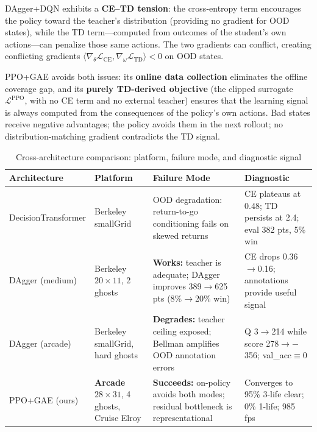 \documentclass[11pt,a4paper]{article}
\theoremstyle{definition}
\begin{document}
DAgger+DQN exhibits a \textbf{CE--TD tension}: the cross-entropy term encourages the policy toward the teacher's distribution (providing no gradient for OOD states), while the TD term---computed from outcomes of the student's own actions---can penalize those same actions. The two gradients can conflict, creating conflicting gradients $\langle \nabla_\theta\mathcal{L}_{\text{CE}}, \nabla_\omega\mathcal{L}_{\text{TD}} \rangle < 0$ on OOD states.

PPO+GAE avoids both issues: its \textbf{online data collection} eliminates the offline coverage gap, and its \textbf{purely TD-derived objective} (the clipped surrogate $\mathcal{L}^{\text{PPO}}$, with no CE term and no external teacher) ensures that the learning signal is always computed from the consequences of the policy's own actions. Bad states receive negative advantages; the policy avoids them in the next rollout; no distribution-matching gradient contradicts the TD signal.

\begin{table}[ht]
\centering
\small
\caption{Cross-architecture comparison: platform, failure mode, and diagnostic signal}
\label{tab:cross-arch}
\begin{tabular}{@{}p{2.2cm}p{2.6cm}p{3.2cm}p{3.4cm}@{}}
\toprule
\textbf{Architecture} & \textbf{Platform} & \textbf{Failure Mode} & \textbf{Diagnostic} \\
\midrule
Decision\-Transformer & Berkeley smallGrid & OOD degradation: return-to-go conditioning fails on skewed returns & CE plateaus at 0.48; TD persists at 2.4; eval 382 pts, 5\% win \\
\midrule
DAgger (medium) & Berkeley $20\!\times\!11$, 2 ghosts & \textbf{Works:} teacher is adequate; DAgger improves 389$\to$625 pts (8\%$\to$20\% win) & CE drops 0.36$\to$0.16; annotations provide useful signal \\
\midrule
DAgger (arcade) & Berkeley smallGrid, hard ghosts & \textbf{Degrades:} teacher ceiling exposed; Bellman amplifies OOD annotation errors & Q 3$\to$214 while score 278$\to$$-$356; val\_acc$\equiv$0 \\
\midrule
PPO+GAE (ours) & \textbf{Arcade} $28\!\times\!31$, 4 ghosts, Cruise Elroy & \textbf{Succeeds:} on-policy avoids both modes; residual bottleneck is representational & Converges to 95\% 3-life clear; 0\% 1-life; 985 fps \\
\bottomrule
\end{tabular}
\end{table}
\end{document}
